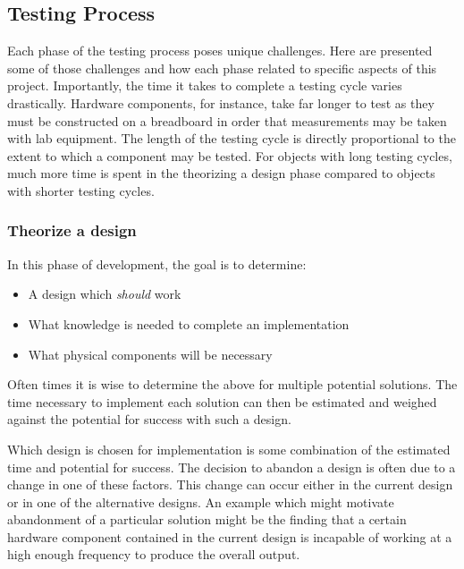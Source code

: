 \documentclass{article}	%
\begin{document}
\begin{multicols}{2}
\subsection{Testing Process}
Each phase of the testing process poses unique challenges.
Here are presented some of those challenges and
how each phase related to specific aspects of this project.
Importantly, the time it takes to complete a 
testing cycle varies drastically.
Hardware components, for instance, take far longer to test
as they must be constructed on a breadboard in order that 
measurements may be taken with lab equipment.
%
The length of the testing cycle is 
directly proportional to the extent to
which a component may be tested.
%
For objects with long testing cycles,
much more time is spent in the 
theorizing a design phase compared to
objects with shorter testing cycles.

\subsubsection{Theorize a design}
In this phase of development,
the goal is to determine:
\begin{itemize}
\item A design which \emph{should} work
\item What knowledge is needed to complete an implementation
\item What physical components will be necessary
\end{itemize}

Often times it is wise to determine the above for
multiple potential solutions.
The time necessary to implement each solution
can then be estimated and weighed against
the potential for success with such a design.

Which design is chosen for implementation is
some combination of the estimated time and
potential for success.
The decision to abandon a design is often
due to a change in one of these factors.
This change can occur either
in the current design or
in one of the alternative designs.
An example which might motivate abandonment of a 
particular solution might be
the finding that a certain hardware component
contained in the current design is incapable of 
working at a high enough frequency to
produce the overall output.



\end{multicols}
\end{document}

